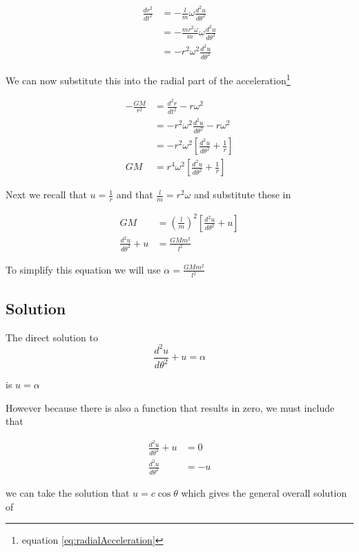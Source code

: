 \begin{align}
\frac{dr^2}{dt^2}&= -\frac{l}{m}\omega\frac{d^2u}{d\theta^2} \nonumber \\
&= -\frac{mr^2\omega}{m}\omega\frac{d^2u}{d\theta^2} \nonumber \\
&= -r^2\omega^2\frac{d^2u}{d\theta^2}
\end{align}

We can now substitute this into the radial part of the acceleration\footnote{equation \ref{eq:radialAcceleration}}

\begin{align}
-\frac{GM}{r^2}&= \frac{ d^2 r}{d t^2} -r \omega^2  \nonumber \\
&=-r^2\omega^2\frac{d^2u}{d\theta^2} -r\omega^2 \nonumber \\
&=-r^2\omega^2\left[\frac{d^2u}{d\theta^2}+\frac{1}{r}\right] \nonumber \\
GM&=r^4\omega^2\left[\frac{d^2u}{d\theta^2}+\frac{1}{r}\right]
\end{align}

Next we recall that $u=\frac{1}{r}$ and that $\frac{l}{m}=r^2\omega$ and substitute these in

\begin{align}
GM&=\left(\frac{l}{m}\right)^2\left[\frac{d^2u}{d\theta^2}+u\right] \nonumber\\
\frac{d^2u}{d\theta^2}+u &=\frac{GMm^2}{l^2}
\end{align}

To simplify this equation we will use $\alpha=\frac{GMm^2}{l^2}$

\subsection{Solution}

The direct solution to
\begin{equation}
\frac{d^2u}{d\theta^2}+u =\alpha
\end{equation}

is $u=\alpha$

However because there is also a function that results in zero, we must include that

\begin{align}
\frac{d^2u}{d\theta^2}+u &=0 \nonumber \\
\frac{d^2u}{d\theta^2} &=-u
\end{align}

we can take the solution that $u=c\cos\theta$ which gives the general overall solution of

